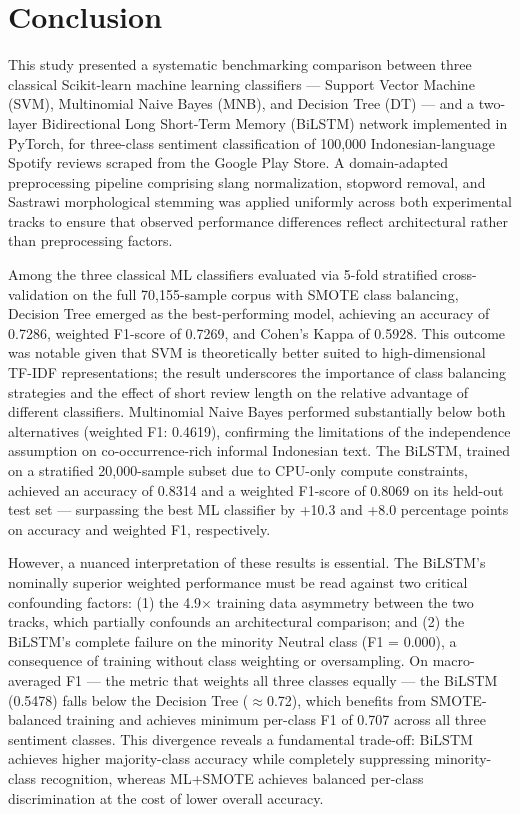 \documentclass{article}
\begin{document}
\section{Conclusion}
\label{sec:conclusion}

This study presented a systematic benchmarking comparison between three classical Scikit-learn machine learning classifiers --- Support Vector Machine (SVM), Multinomial Naive Bayes (MNB), and Decision Tree (DT) --- and a two-layer Bidirectional Long Short-Term Memory (BiLSTM) network implemented in PyTorch, for three-class sentiment classification of 100,000 Indonesian-language Spotify reviews scraped from the Google Play Store. A domain-adapted preprocessing pipeline comprising slang normalization, stopword removal, and Sastrawi morphological stemming was applied uniformly across both experimental tracks to ensure that observed performance differences reflect architectural rather than preprocessing factors.

Among the three classical ML classifiers evaluated via 5-fold stratified cross-validation on the full 70,155-sample corpus with SMOTE class balancing, Decision Tree emerged as the best-performing model, achieving an accuracy of 0.7286, weighted F1-score of 0.7269, and Cohen's Kappa of 0.5928. This outcome was notable given that SVM is theoretically better suited to high-dimensional TF-IDF representations; the result underscores the importance of class balancing strategies and the effect of short review length on the relative advantage of different classifiers. Multinomial Naive Bayes performed substantially below both alternatives (weighted F1: 0.4619), confirming the limitations of the independence assumption on co-occurrence-rich informal Indonesian text. The BiLSTM, trained on a stratified 20,000-sample subset due to CPU-only compute constraints, achieved an accuracy of 0.8314 and a weighted F1-score of 0.8069 on its held-out test set --- surpassing the best ML classifier by +10.3 and +8.0 percentage points on accuracy and weighted F1, respectively.

However, a nuanced interpretation of these results is essential. The BiLSTM's nominally superior weighted performance must be read against two critical confounding factors: (1) the 4.9$\times$ training data asymmetry between the two tracks, which partially confounds an architectural comparison; and (2) the BiLSTM's complete failure on the minority Neutral class (F1 = 0.000), a consequence of training without class weighting or oversampling. On macro-averaged F1 --- the metric that weights all three classes equally --- the BiLSTM (0.5478) falls below the Decision Tree ($\approx$0.72), which benefits from SMOTE-balanced training and achieves minimum per-class F1 of 0.707 across all three sentiment classes. This divergence reveals a fundamental trade-off: BiLSTM achieves higher majority-class accuracy while completely suppressing minority-class recognition, whereas ML+SMOTE achieves balanced per-class discrimination at the cost of lower overall accuracy.
\end{document}
